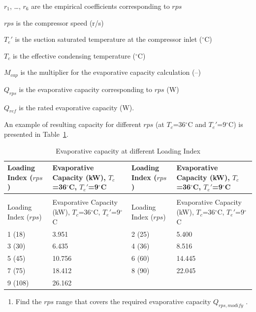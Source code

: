 $r_1$, \ldots, $r_6$ are the empirical coefficients corresponding to $rps$  

$rps$ is the compressor speed (r/s) 

${T_e}'$ is the suction saturated temperature at the compressor inlet (\(^{\circ}\)C)

$T_c$ is the effective condensing temperature (\(^{\circ}\)C)

$M_{cap}$ is the multiplier for the evaporative capacity calculation (--)

$Q_{rps}$ is the evaporative capacity corresponding to $rps$ (W) 

$Q_{ref}$ is the rated evaporative capacity (W).

An example of resulting capacity for different $rps$ (at $T_c$=36\(^{\circ}\)C and ${T_e}'$=9\(^{\circ}\)C) is presented in Table~\ref{table:evaporative-capacity-at-different-loading-index}.

\begin{longtable}[c]{>{\raggedright}p{1.5in}>{\raggedright}p{1.5in}>{\raggedright}p{1.5in}>{\raggedright}p{1.5in}}
\caption{Evaporative capacity at different Loading Index \label{table:evaporative-capacity-at-different-loading-index}} \tabularnewline
\toprule 
Loading Index ($rps$) & Evaporative Capacity (kW), $T_c$=36\(^{\circ}\)C, ${T_e}'$=9\(^{\circ}\)C & Loading Index ($rps$) & Evaporative Capacity (kW), $T_c$=36\(^{\circ}\)C, ${T_e}'$=9\(^{\circ}\)C \tabularnewline
\midrule
\endfirsthead

\caption[]{Evaporative capacity at different Loading Index} \tabularnewline
\toprule 
Loading Index ($rps$) & Evaporative Capacity (kW), $T_c$=36\(^{\circ}\)C, ${T_e}'$=9\(^{\circ}\)C & Loading Index ($rps$) & Evaporative Capacity (kW), $T_c$=36\(^{\circ}\)C, ${T_e}'$=9\(^{\circ}\)C \tabularnewline
\midrule
\endhead

1 (18)  & 3.951  & 2 (25) & 5.400  \tabularnewline
3 (30)  & 6.435  & 4 (36) & 8.516  \tabularnewline
5 (45)  & 10.756 & 6 (60) & 14.445 \tabularnewline
7 (75)  & 18.412 & 8 (90) & 22.045 \tabularnewline
9 (108) & 26.162 &        &        \tabularnewline
\bottomrule
\end{longtable}

\begin{enumerate}
\def\labelenumi{\alph{enumi}.}
\setcounter{enumi}{1}
\tightlist
\item
  Find the \(rps\) range that covers the required evaporative capacity \(Q_{rps,modify}\) .
\end{enumerate}

